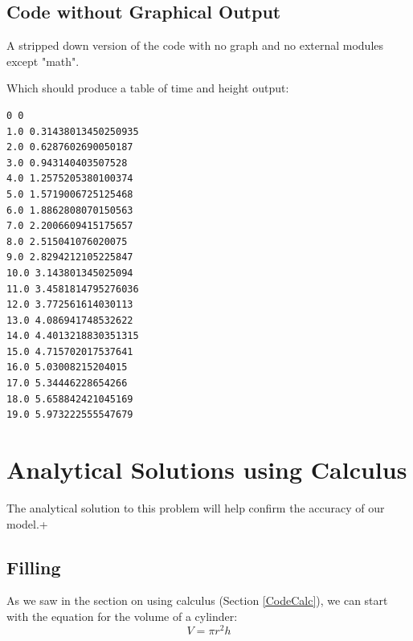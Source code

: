 \documentclass[11pt,fleqn]{book}
\begin{document}
	
	
	
	\subsection{Code without Graphical Output}
	A stripped down version of the code with no graph and no external modules except "math".
	
	
	
	
	Which should produce a table of time and height output:
	
	\begin{lstlisting}
0 0
1.0 0.31438013450250935
2.0 0.6287602690050187
3.0 0.943140403507528
4.0 1.2575205380100374
5.0 1.5719006725125468
6.0 1.8862808070150563
7.0 2.2006609415175657
8.0 2.515041076020075
9.0 2.8294212105225847
10.0 3.143801345025094
11.0 3.4581814795276036
12.0 3.772561614030113
13.0 4.086941748532622
14.0 4.4013218830351315
15.0 4.715702017537641
16.0 5.03008215204015
17.0 5.34446228654266
18.0 5.658842421045169
19.0 5.973222555547679
	\end{lstlisting}



\section{Analytical Solutions using Calculus}

	The analytical solution to this problem will help confirm the accuracy of our model.+

	\subsection{Filling}

	As we saw in the section on using calculus (Section \ref{CodeCalc}), we can start with the equation for the volume of a cylinder:
	\begin{equation}
		V = \pi r^2 h
	\end{equation}
	
\end{document}
